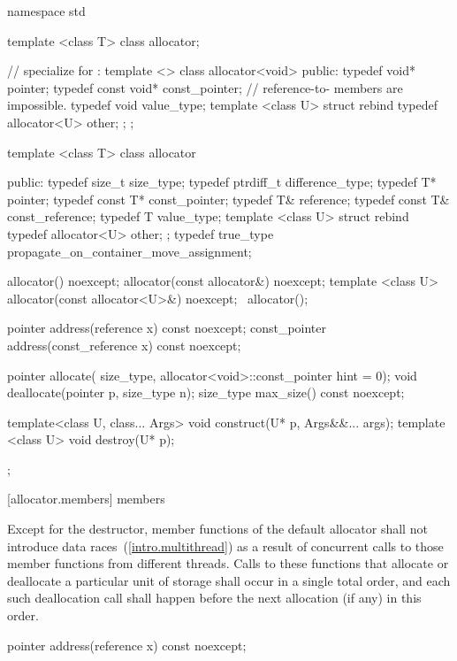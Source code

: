 %
\begin{codeblock}
namespace std {
  template <class T> class allocator;

  // specialize for :
  template <> class allocator<void> {
  public:
    typedef void*   pointer;
    typedef const void* const_pointer;
    // reference-to- members are impossible.
    typedef void  value_type;
    template <class U> struct rebind { typedef allocator<U> other; };
  };

  template <class T> class allocator {
   public:
    typedef size_t    size_type;
    typedef ptrdiff_t difference_type;
    typedef T*        pointer;
    typedef const T*  const_pointer;
    typedef T&        reference;
    typedef const T&  const_reference;
    typedef T         value_type;
    template <class U> struct rebind { typedef allocator<U> other; };
    typedef true_type propagate_on_container_move_assignment;
    
    allocator() noexcept;
    allocator(const allocator&) noexcept;
    template <class U> allocator(const allocator<U>&) noexcept;
   ~allocator();

    pointer address(reference x) const noexcept;
    const_pointer address(const_reference x) const noexcept;

    pointer allocate(
      size_type, allocator<void>::const_pointer hint = 0);
    void deallocate(pointer p, size_type n);
    size_type max_size() const noexcept;

    template<class U, class... Args>
      void construct(U* p, Args&&... args);
    template <class U>
      void destroy(U* p);
  };
}
\end{codeblock}

[allocator.members]{ members}

\pnum
Except for the destructor, member functions of the default allocator shall not introduce
data races~(\ref{intro.multithread}) as a result of concurrent calls to those member
functions from different threads. Calls to these functions that allocate or deallocate a
particular unit of storage shall occur in a single total order, and each such
deallocation call shall happen before the next allocation (if any) in this order.

\begin{itemdecl}
pointer address(reference x) const noexcept;
\end{itemdecl}

